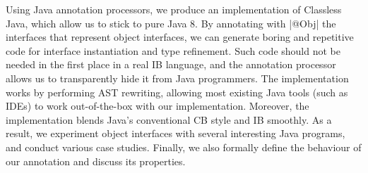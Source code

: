 






Using Java annotation processors, we produce an implementation of
Classless Java, which allow us to stick to pure Java 8. By annotating
with \Q|@Obj| the interfaces that represent object interfaces, we can
generate boring and repetitive code for interface instantiation and
type refinement. Such code should not be needed in the first place in
a real IB language, and the annotation processor allows us to
transparently hide it from Java programmers.  The implementation works
by performing AST rewriting, allowing most existing Java tools (such as
IDEs) to work out-of-the-box with our implementation. Moreover, the
implementation blends Java's conventional CB style and IB smoothly.
As a result, we experiment object interfaces with several interesting
Java programs, and conduct various case studies.  Finally, we also
formally define the behaviour of our \mixin annotation and discuss
its properties.



%



